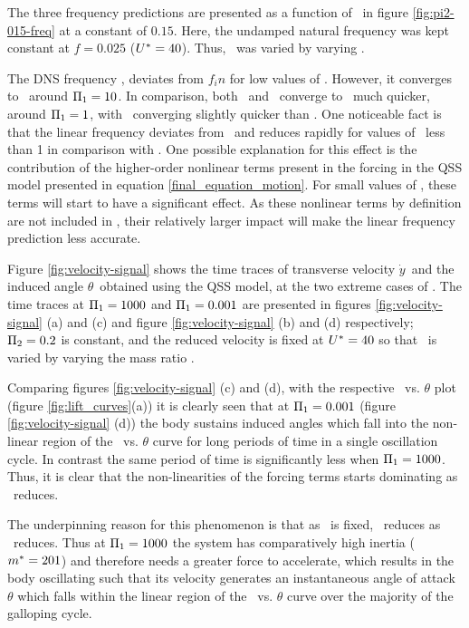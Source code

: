 The three frequency predictions are presented as a function of  \massstiff\ in figure \ref{fig:pi2-015-freq} at a constant \massdamp of $0.15$. Here, the undamped natural frequency was kept constant at $f=0.025$ ($U^{*}=40$). Thus, \massstiff\ was varied by varying \mstar. 


The DNS frequency \freqdns, deviates from $f_in$ for low values of \massstiff. However, it converges to \freqinput\ around $\Pi_1=10$. In comparison, both \freqlin\ and \freqqss\ converge to \freqinput\ much quicker, around $\Pi_1 = 1$, with \freqlin\ converging slightly quicker than \freqqss. One noticeable fact is that the linear frequency deviates from \freqinput\ and reduces rapidly for values of \massstiff\ less than 1 in comparison with \freqqss. One possible explanation for this effect is the contribution of the higher-order nonlinear terms present in the forcing in the QSS model presented in equation \ref{final_equation_motion}. For small values of \massstiff, these terms will start to have a significant effect. As these nonlinear terms by definition are not included in \freqlin, their relatively larger impact will make the linear frequency prediction less accurate.

          

Figure \ref{fig:velocity-signal} shows the time traces of transverse velocity $\dot{y}$\ and the induced angle $\theta$\ obtained using the QSS model, at the two extreme cases of \massstiff. The time traces at $\Pi_1=1000$ and $\Pi_1=0.001$ are presented in figures  \ref{fig:velocity-signal} (a) and (c) and  figure \ref{fig:velocity-signal} (b) and (d) respectively; $\Pi_2=0.2$ is constant, and the reduced velocity is fixed at $U^{*}=40$ so that \massstiff\ is varied by varying the mass ratio \mstar.

Comparing figures \ref{fig:velocity-signal} (c) and (d), with the respective \cy\ vs. $\theta$ plot (figure \ref{fig:lift_curves}(a)) it is clearly seen that at $\Pi_1=0.001$ (figure \ref{fig:velocity-signal} (d)) the body sustains induced angles which fall into the non-linear region of the \cy\ vs. $\theta$ curve for long periods of time in a single oscillation cycle. In contrast the same period of time is significantly less when $\Pi_1=1000$. Thus, it is clear that the non-linearities of the forcing terms starts dominating as \massstiff\ reduces. 

The underpinning reason for this phenomenon is that as \massdamp\ is fixed, \mstar\ reduces as \massstiff\ reduces. Thus at $\Pi_1=1000$ the system has comparatively high inertia ($m^{*}=201$) and therefore needs a greater force to accelerate, which results in the body oscillating such that its velocity generates an instantaneous angle of attack  $\theta$ which falls within the linear region of the \cy\ vs. $\theta$ curve over the majority of the galloping cycle.

